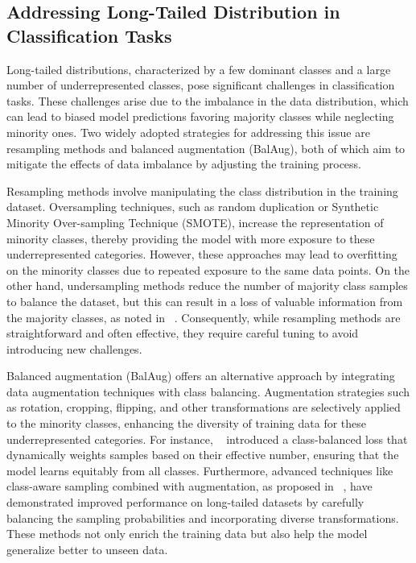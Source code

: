 \subsection{Addressing Long-Tailed Distribution in Classification Tasks}

Long-tailed distributions, characterized by a few dominant classes and a large number of underrepresented classes, pose significant challenges in classification tasks. These challenges arise due to the imbalance in the data distribution, which can lead to biased model predictions favoring majority classes while neglecting minority ones. Two widely adopted strategies for addressing this issue are resampling methods and balanced augmentation (BalAug), both of which aim to mitigate the effects of data imbalance by adjusting the training process.

Resampling methods involve manipulating the class distribution in the training dataset. Oversampling techniques, such as random duplication or Synthetic Minority Over-sampling Technique (SMOTE), increase the representation of minority classes, thereby providing the model with more exposure to these underrepresented categories. However, these approaches may lead to overfitting on the minority classes due to repeated exposure to the same data points. On the other hand, undersampling methods reduce the number of majority class samples to balance the dataset, but this can result in a loss of valuable information from the majority classes, as noted in ~\cite{bellinger2020remix}. Consequently, while resampling methods are straightforward and often effective, they require careful tuning to avoid introducing new challenges.

Balanced augmentation (BalAug) offers an alternative approach by integrating data augmentation techniques with class balancing. Augmentation strategies such as rotation, cropping, flipping, and other transformations are selectively applied to the minority classes, enhancing the diversity of training data for these underrepresented categories. For instance, ~\cite{cui2019class} introduced a class-balanced loss that dynamically weights samples based on their effective number, ensuring that the model learns equitably from all classes. Furthermore, advanced techniques like class-aware sampling combined with augmentation, as proposed in ~\cite{liu2022long}, have demonstrated improved performance on long-tailed datasets by carefully balancing the sampling probabilities and incorporating diverse transformations. These methods not only enrich the training data but also help the model generalize better to unseen data.

